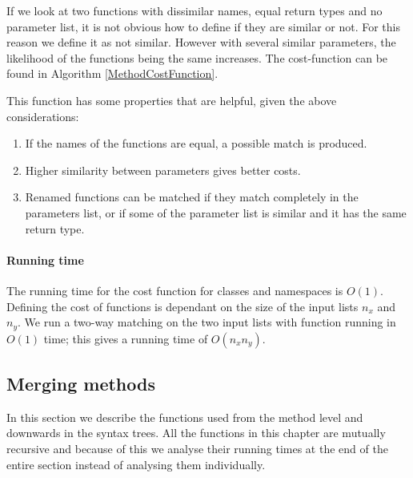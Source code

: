 \documentclass[11pt]{article}
\begin{document}
If we look at two functions with dissimilar names, equal return types and no parameter list, it is not obvious how to define if they are similar or not. For this reason we define it as not similar. However with several similar parameters, the likelihood of the functions being the same increases.  The cost-function can be found in Algorithm \ref{MethodCostFunction}.

This function has some properties that are helpful, given the above considerations:

\begin{enumerate}
\item If the names of the functions are equal, a possible match is produced.
\item Higher similarity between parameters gives better costs.
\item Renamed functions can be matched if they match completely in the parameters list, or if some of the parameter list is similar and it has the same return type.
\end{enumerate}

\paragraph{Running time} The running time for the cost function for classes and namespaces is $O(1)$. Defining the cost of functions is dependant on the size of the input lists $n_x$ and $n_y$. We run a two-way matching on the two input lists with function running in $O(1)$ time; this gives a running time of $O(n_x n_y)$.

\subsection{Merging methods}
In this section we describe the functions used from the method level and downwards in the syntax trees. All the functions in this chapter are mutually recursive and because of this we analyse their running times at the end of the entire section instead of analysing them individually.

\label{MergingFunction}
\end{document}

